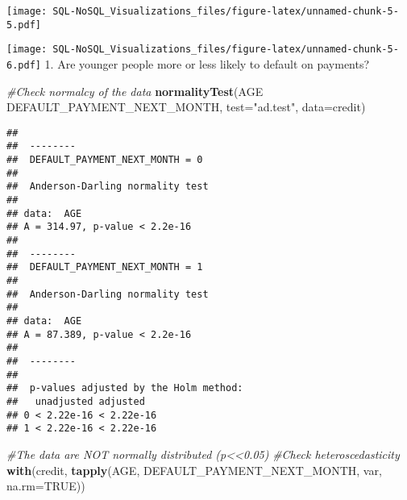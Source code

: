 \documentclass[]{article}
\newenvironment{Shaded}{\begin{snugshade}}{\end{snugshade}}
\newcommand{\KeywordTok}[1]{\textcolor[rgb]{0.13,0.29,0.53}{\textbf{#1}}}
\newcommand{\DataTypeTok}[1]{\textcolor[rgb]{0.13,0.29,0.53}{#1}}
\newcommand{\StringTok}[1]{\textcolor[rgb]{0.31,0.60,0.02}{#1}}
\newcommand{\CommentTok}[1]{\textcolor[rgb]{0.56,0.35,0.01}{\textit{#1}}}
\newcommand{\OtherTok}[1]{\textcolor[rgb]{0.56,0.35,0.01}{#1}}
\newcommand{\OperatorTok}[1]{\textcolor[rgb]{0.81,0.36,0.00}{\textbf{#1}}}
\newcommand{\NormalTok}[1]{#1}
\begin{document}
\texttt{[image: SQL-NoSQL\_Visualizations\_files/figure-latex/unnamed-chunk-5-5.pdf]}

\begin{Shaded}
\end{Shaded}

\texttt{[image: SQL-NoSQL\_Visualizations\_files/figure-latex/unnamed-chunk-5-6.pdf]}
1. Are younger people more or less likely to default on payments?

\begin{Shaded}
\begin{Highlighting}[]
\CommentTok{#Check normalcy of the data}
\KeywordTok{normalityTest}\NormalTok{(AGE }\OperatorTok{~}\StringTok{ }\NormalTok{DEFAULT_PAYMENT_NEXT_MONTH, }\DataTypeTok{test=}\StringTok{"ad.test"}\NormalTok{, }\DataTypeTok{data=}\NormalTok{credit)}
\end{Highlighting}
\end{Shaded}

\begin{verbatim}
## 
##  --------
##  DEFAULT_PAYMENT_NEXT_MONTH = 0 
## 
##  Anderson-Darling normality test
## 
## data:  AGE
## A = 314.97, p-value < 2.2e-16
## 
##  --------
##  DEFAULT_PAYMENT_NEXT_MONTH = 1 
## 
##  Anderson-Darling normality test
## 
## data:  AGE
## A = 87.389, p-value < 2.2e-16
## 
##  --------
## 
##  p-values adjusted by the Holm method:
##   unadjusted adjusted  
## 0 < 2.22e-16 < 2.22e-16
## 1 < 2.22e-16 < 2.22e-16
\end{verbatim}

\begin{Shaded}
\begin{Highlighting}[]
\CommentTok{#The data are NOT normally distributed (p<<0.05)}
\CommentTok{#Check heteroscedasticity}
\KeywordTok{with}\NormalTok{(credit, }\KeywordTok{tapply}\NormalTok{(AGE, DEFAULT_PAYMENT_NEXT_MONTH, var, }\DataTypeTok{na.rm=}\OtherTok{TRUE}\NormalTok{))}
\end{Highlighting}
\end{Shaded}
\end{document}
